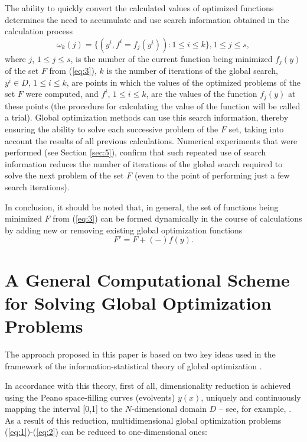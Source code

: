 \documentclass[review]{elsarticle}
\begin{document}
The ability to quickly convert the calculated values of optimized functions determines the need to accumulate and use search information obtained in the calculation process
\begin{equation}\label{eq:9}
\omega_k (j)=\{(y^i,f^i=f_j(y^i)):1 \leq i \leq k \},1 \leq j \leq s,
\end{equation}
where $j$, $1 \leq j \leq s$, is the number of the current function being minimized $f_j (y)$ of the set $F$ from (\ref{eq:3}), $k$ is the number of iterations of the global search, $y^i \in D$, $1 \leq i \leq k$,  are points in which the values of the optimized problems of the set $F$ were computed, and $f^i$, $1 \leq i \leq k$, are the values of the function $f_j (y)$ at these points (the procedure for calculating the value of the function will be called a trial). Global optimization methods can use this search information, thereby ensuring the ability to solve each successive problem of the $F$ set, taking into account the results of all previous calculations. Numerical experiments that were performed (see Section \ref{sec:5}), confirm that such repeated use of search information reduces the number of iterations of the global search required to solve the next problem of the set $F$ (even to the point of performing just a few search iterations).

In conclusion, it should be noted that, in general, the set of functions being minimized $F$ from (\ref{eq:3}) can be formed dynamically in the course of calculations by adding new or removing existing global optimization functions
\begin{equation}\label{eq:10}
F'=F+(-) f(y).
\end{equation}


\section{A General Computational Scheme for Solving Global Optimization Problems}\label{sec:3}

The approach proposed in this paper is based on two key ideas used in the framework of the information-statistical theory of global optimization \cite{c6}.

In accordance with this theory, first of all, dimensionality reduction is achieved using the Peano space-filling curves (evolvents) $y(x)$, uniquely and continuously mapping the interval [0,1] to the $N$-dimensional domain $D$ -- see, for example, \cite{c6,c23}. As a result of this reduction, multidimensional global optimization problems (\ref{eq:1})-(\ref{eq:2}) can be reduced to one-dimensional ones:
\end{document}
